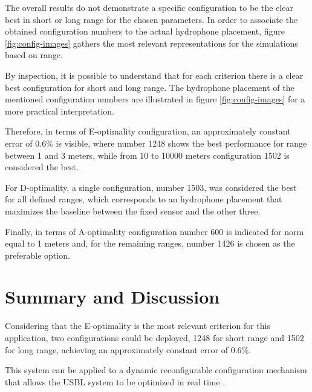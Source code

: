 The overall results do not demonstrate a specific configuration to be the clear best in short or long range for the chosen parameters. In order to associate the obtained configuration numbers to the actual hydrophone placement, figure \ref{fig:config-images} gathers the most relevant representations for the simulations based on range. 

By inspection, it is possible to understand that for each criterion there is a clear best configuration for short and long range. The hydrophone placement of the mentioned configuration numbers are illustrated in figure \ref{fig:config-images} for a more practical interpretation. 

Therefore, in terms of E-optimality configuration, an approximately constant error of 0.6\% is visible, where number 1248 shows the best performance for range between 1 and 3 meters, while from 10 to 10000 meters configuration 1502 is considered the best.

For D-optimality, a single configuration, number 1503, was considered the best for all defined ranges, which corresponds to an hydrophone placement that maximizes the baseline between the fixed sensor and the other three.

Finally, in terms of A-optimality configuration number 600 is indicated for norm equal to 1 meters and, for the remaining ranges, number 1426 is chosen as the preferable option.

\section{Summary and Discussion}



Considering that the E-optimality is the most relevant criterion for this application, two configurations could be deployed, 1248 for short range and 1502 for long range, achieving an approximately constant error of 0.6\%.

This system can be applied to a dynamic reconfigurable configuration mechanism that allows the USBL system to be optimized in real time .
